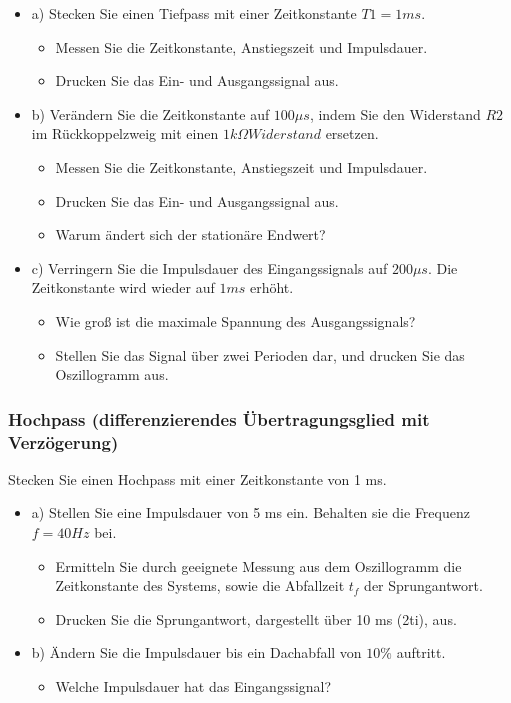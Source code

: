 \begin{itemize}
\item a) Stecken Sie einen Tiefpass mit einer Zeitkonstante $T1 = 1ms$. 
\begin{itemize}
	\item Messen Sie die Zeitkonstante, Anstiegszeit und Impulsdauer. 
	\item Drucken Sie das Ein- und Ausgangssignal aus.
\end{itemize}
\end{itemize} 
\begin{itemize}
	\item b) Verändern  Sie  die  Zeitkonstante auf  $100  \mu s$,  indem  Sie  den  Widerstand  $R2$ im Rückkoppelzweig 
			mit einen $1k \Omega Widerstand$ ersetzen. 
\begin{itemize}
	\item Messen Sie die Zeitkonstante, Anstiegszeit und Impulsdauer. 
	\item Drucken Sie das Ein- und Ausgangssignal aus. 
	\item Warum ändert sich der stationäre Endwert? 
\end{itemize}
\end{itemize}
\begin{itemize}
	\item c) Verringern  Sie  die  Impulsdauer  des  Eingangssignals  auf  $200 \mu s$.  Die  Zeitkonstante wird wieder auf $1 ms$ erhöht. 
\begin{itemize}
	\item Wie groß ist die maximale Spannung des Ausgangssignals? 
	\item Stellen Sie das Signal über zwei Perioden dar, und drucken Sie das Oszillogramm aus. 
\end{itemize}
\end{itemize}
\subsubsection{Hochpass (differenzierendes Übertragungsglied mit Verzögerung)}
Stecken Sie einen Hochpass mit einer Zeitkonstante von 1 ms.\\
\begin{itemize}
	\item a) Stellen Sie eine Impulsdauer von 5 ms ein. Behalten sie die Frequenz $f =40 Hz$ bei.
\begin{itemize}
\item Ermitteln Sie durch geeignete Messung aus dem Oszillogramm die Zeitkonstante des Systems, sowie die Abfallzeit $t_{f}$ der Sprungantwort. 
\item Drucken Sie die Sprungantwort, dargestellt über 10 ms (2ti), aus. 
\end{itemize}
\end{itemize}
\begin{itemize}
	\item b) Ändern Sie die Impulsdauer bis ein Dachabfall von $10\%$ auftritt.\\
\begin{itemize}
	\item Welche Impulsdauer hat das Eingangssignal?	
\end{itemize}
\end{itemize}
